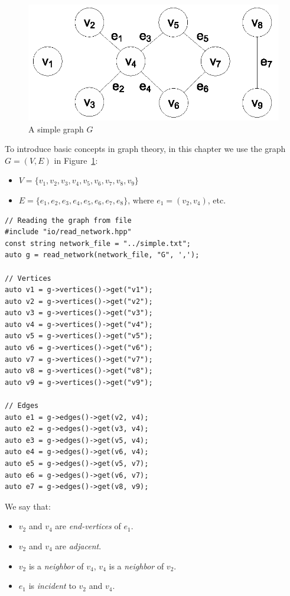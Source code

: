 \begin{figure}
    \centering
    \includegraphics[width=.6\linewidth]{figs/G.eps}
    \caption{A simple graph $G$}
    \label{fig:G}
\end{figure}


To introduce basic concepts in graph theory, in this chapter we use the graph $G = (V, E)$ in Figure~\ref{fig:G}:
\begin{itemize}
    \item $ V = \{ v_1, v_2, v_3, v_4, v_5, v_6, v_7, v_8, v_9 \} $
    \item $ E = \{ e_1, e_2, e_3, e_4, e_5, e_6, e_7, e_8 \} $, where $ e_1 = (v_2, v_4)$, etc.
\end{itemize}

\begin{lstlisting}[style=c++]
// Reading the graph from file
#include "io/read_network.hpp"
const string network_file = "../simple.txt";
auto g = read_network(network_file, "G", ',');

// Vertices
auto v1 = g->vertices()->get("v1");
auto v2 = g->vertices()->get("v2");
auto v3 = g->vertices()->get("v3");
auto v4 = g->vertices()->get("v4");
auto v5 = g->vertices()->get("v5");
auto v6 = g->vertices()->get("v6");
auto v7 = g->vertices()->get("v7");
auto v8 = g->vertices()->get("v8");
auto v9 = g->vertices()->get("v9");

// Edges
auto e1 = g->edges()->get(v2, v4);
auto e2 = g->edges()->get(v3, v4);
auto e3 = g->edges()->get(v5, v4);
auto e4 = g->edges()->get(v6, v4);
auto e5 = g->edges()->get(v5, v7);
auto e6 = g->edges()->get(v6, v7);
auto e7 = g->edges()->get(v8, v9);
\end{lstlisting}

We say that:
\begin{itemize}
    \item $v_2$ and $v_4$ are \emph{end-vertices} of $e_1$.
    \item $v_2$ and $v_4$ are \emph{adjacent}.
    \item $v_2$ is a \emph{neighbor} of $v_4$, $v_4$ is a \emph{neighbor} of $v_2$.
    \item $e_1$ is \emph{incident} to $v_2$ and $v_4$.
\end{itemize}

